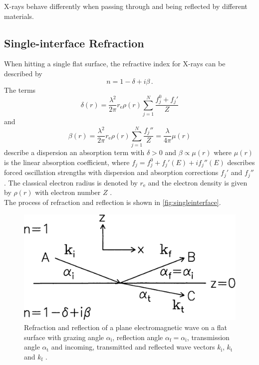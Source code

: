 X-rays behave differently when passing through and being reflected by different materials.

\subsection{Single-interface Refraction}

When hitting a single flat surface, the refractive index for X-rays can be described by
\begin{equation}
    n = 1 - \delta + i\beta \,.
    \label{eq:refractiveindex}
\end{equation}
The terms
\begin{equation*}
    \delta(r) = \frac{\lambda^2}{2 \pi} r_\text{e} \rho(r) \sum_{j=1}^N \frac{f_j^0 + f_j'}{Z}
\end{equation*} and
\begin{equation*}
    \beta(r) =  \frac{\lambda^2}{2 \pi} r_\text{e} \rho(r) \sum_{j=1}^N \frac{f_j''}{Z} = \frac{\lambda}{4 \pi} \mu(r)
\end{equation*} describe a dispersion an absorption term with $\delta > 0$ and $\beta \propto \mu(r)$ where $\mu(r)$ is the linear
absorption coefficient, where $f_j = f_j^0 + f_j'(E) + if_j''(E)$ describes forced oscillation strengths with dispersion and absorption corrections $f_j'$ and $f_j''$.
The classical electron radius is denoted by $r_\text{e}$ and the electron density is given by $\rho(r)$ with electron number $Z$ \cite{tolan}. \\
The process of refraction and reflection is shown in \autoref{fig:singleinterface}.

\begin{figure}[H]
    \centering
    \includegraphics[width=.9\textwidth]{figures/scattering.png}
    \caption{Refraction and reflection of a plane electromagnetic wave on a flat surface with grazing angle $\alpha_\text{i}$, 
    reflection angle $\alpha_\text{f} = \alpha_\text{i}$, transmission angle $\alpha_\text{t}$ and incoming, transmitted and reflected wave vectors $k_\text{i}$, $k_\text{t}$ and $k_\text{f}$ \cite{tolan}.}
    \label{fig:singleinterface}
\end{figure}

